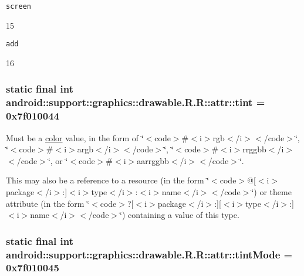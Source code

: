 {\tt screen}

15

{\tt add}

16\hypertarget{classandroid_1_1support_1_1graphics_1_1drawable_1_1_r_1_1attr_3eb5334d229742d1e7919875b5f23c93}{
\subsubsection[{tint}]{\setlength{\rightskip}{0pt plus 5cm}static final int android::support::graphics::drawable.R.R::attr::tint = 0x7f010044}}
\label{classandroid_1_1support_1_1graphics_1_1drawable_1_1_r_1_1attr_3eb5334d229742d1e7919875b5f23c93}


Must be a \hyperlink{classandroid_1_1support_1_1graphics_1_1drawable_1_1_r_1_1color}{color} value, in the form of \char`\"{}$<$code$>$\#$<$i$>$rgb$<$/i$>$$<$/code$>$\char`\"{}, \char`\"{}$<$code$>$\#$<$i$>$argb$<$/i$>$$<$/code$>$\char`\"{}, \char`\"{}$<$code$>$\#$<$i$>$rrggbb$<$/i$>$$<$/code$>$\char`\"{}, or \char`\"{}$<$code$>$\#$<$i$>$aarrggbb$<$/i$>$$<$/code$>$\char`\"{}. 

This may also be a reference to a resource (in the form \char`\"{}$<$code$>$@\mbox{[}$<$i$>$package$<$/i$>$:\mbox{]}$<$i$>$type$<$/i$>$:$<$i$>$name$<$/i$>$$<$/code$>$\char`\"{}) or theme attribute (in the form \char`\"{}$<$code$>$?\mbox{[}$<$i$>$package$<$/i$>$:\mbox{]}\mbox{[}$<$i$>$type$<$/i$>$:\mbox{]}$<$i$>$name$<$/i$>$$<$/code$>$\char`\"{}) containing a value of this type. \hypertarget{classandroid_1_1support_1_1graphics_1_1drawable_1_1_r_1_1attr_1a4319636ee63a6547c1a232d01f9f3d}{
\subsubsection[{tintMode}]{\setlength{\rightskip}{0pt plus 5cm}static final int android::support::graphics::drawable.R.R::attr::tintMode = 0x7f010045}}
\label{classandroid_1_1support_1_1graphics_1_1drawable_1_1_r_1_1attr_1a4319636ee63a6547c1a232d01f9f3d}


